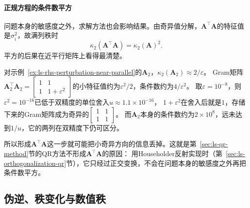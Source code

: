 \paragraph{正规方程的条件数平方}

问题本身的敏感度之外，求解方法也会影响结果。由奇异值分解，$\bm A^\top\bm A$的特征值是$\sigma_i^2$，故满列秩时
\begin{equation}
 \kappa_2(\bm A^\top\bm A)=\kappa_2(\bm A)^2.
 \label{eq:matrix-analysis-normal-equation-condition-square}
\end{equation}
平方的后果在近平行矩阵上看得最清楚。

\begin{example}[形成Gram矩阵时丢失的信息]
\label{ex:ls-gram-rounding-loss}
对示例~\ref{ex:ls-rhs-perturbation-near-parallel}的$\bm A_2$，$\kappa_2(\bm A_2)\approx2/\varepsilon$。
Gram矩阵$\bm A_2^\top\bm A_2=\left[\begin{smallmatrix}1&1\\1&1+\varepsilon^2\end{smallmatrix}\right]$的小特征值约为$\varepsilon^2/2$，条件数约为$4/\varepsilon^2$。
取$\varepsilon=10^{-8}$，则$\varepsilon^2=10^{-16}$已低于双精度的单位舍入$u\approx1.1\times10^{-16}$，
$1+\varepsilon^2$在舍入后就是$1$，存储下来的Gram矩阵成为奇异的$\left[\begin{smallmatrix}1&1\\1&1\end{smallmatrix}\right]$。
而$\bm A_2$本身的条件数约为$2\times10^8$，远未达到$1/u$，它的两列在双精度下仍可区分。
\end{example}

所以形成$\bm A^\top\bm A$这一步就可能把小奇异方向的信息丢掉。这就是第~\ref{sec:ls-qr-method}节的QR方法不形成$\bm A^\top\bm A$的原因：
用Householder反射实现时（第~\ref{sec:ls-orthogonalization-qr}节），它只经过正交变换，不会在问题本身的敏感度之外再把条件数平方。

\subsection{伪逆、秩变化与数值秩}


